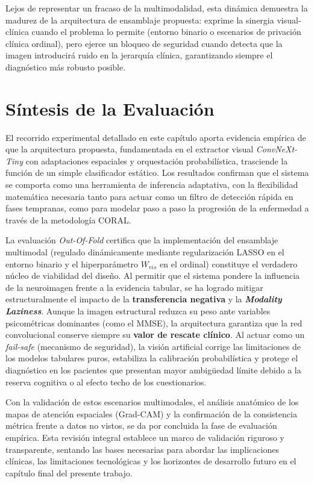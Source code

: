 \documentclass[12pt, oneside, english, spanish]{book}
\begin{document}
Lejos de representar un fracaso de la multimodalidad, esta dinámica demuestra la madurez de la arquitectura de ensamblaje propuesta: exprime la sinergia visual-clínica cuando el problema lo permite (entorno binario o escenarios de privación clínica ordinal), pero ejerce un bloqueo de seguridad cuando detecta que la imagen introducirá ruido en la jerarquía clínica, garantizando siempre el diagnóstico más robusto posible.

\section{Síntesis de la Evaluación} \label{sec:conclusion_experimental}

El recorrido experimental detallado en este capítulo aporta evidencia empírica de que la arquitectura propuesta, fundamentada en el extractor visual \textit{ConvNeXt-Tiny} con adaptaciones espaciales y orquestación probabilística, trasciende la función de un simple clasificador estático. Los resultados confirman que el sistema se comporta como una herramienta de inferencia adaptativa, con la flexibilidad matemática necesaria tanto para actuar como un filtro de detección rápida en fases tempranas, como para modelar paso a paso la progresión de la enfermedad a través de la metodología CORAL.

La evaluación \textit{Out-Of-Fold} certifica que la implementación del ensamblaje multimodal (regulado dinámicamente mediante regularización LASSO en el entorno binario y el hiperparámetro $W_{vis}$ en el ordinal) constituye el verdadero núcleo de viabilidad del diseño. Al permitir que el sistema pondere la influencia de la neuroimagen frente a la evidencia tabular, se ha logrado mitigar estructuralmente el impacto de la \textbf{transferencia negativa} y la \textbf{\textit{Modality Laziness}}. Aunque la imagen estructural reduzca su peso ante variables psicométricas dominantes (como el MMSE), la arquitectura garantiza que la red convolucional conserve siempre su \textbf{valor de rescate clínico}. Al actuar como un \textit{fail-safe} (mecanismo de seguridad), la visión artificial corrige las limitaciones de los modelos tabulares puros, estabiliza la calibración probabilística y protege el diagnóstico en los pacientes que presentan mayor ambigüedad límite debido a la reserva cognitiva o al efecto techo de los cuestionarios.

Con la validación de estos escenarios multimodales, el análisis anatómico de los mapas de atención espaciales (Grad-CAM) y la confirmación de la consistencia métrica frente a datos no vistos, se da por concluida la fase de evaluación empírica. Esta revisión integral establece un marco de validación riguroso y transparente, sentando las bases necesarias para abordar las implicaciones clínicas, las limitaciones tecnológicas y los horizontes de desarrollo futuro en el capítulo final del presente trabajo.
\end{document}
